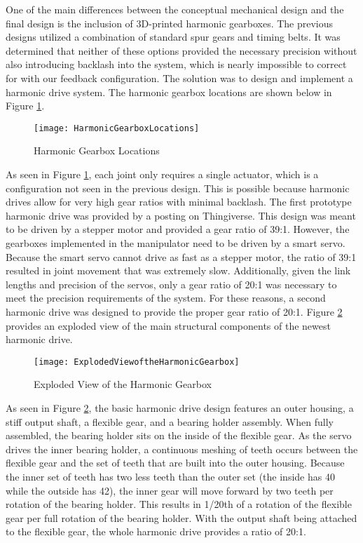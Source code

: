 One of the main differences between the conceptual mechanical design and the final design is the inclusion of 3D-printed harmonic gearboxes. The previous designs utilized a combination of standard spur gears and timing belts. It was determined that neither of these options provided the necessary precision without also introducing backlash into the system, which is nearly impossible to correct for with our feedback configuration. The solution was to design and implement a harmonic drive system. The harmonic gearbox locations are shown below in Figure \ref{fig:HarmonicGearboxLocations}.

\begin{figure}[htp]
  \centering
  \texttt{[image: HarmonicGearboxLocations]}
  \caption{Harmonic Gearbox Locations}
  \label{fig:HarmonicGearboxLocations}
\end{figure}

As seen in Figure \ref{fig:HarmonicGearboxLocations}, each joint only requires a single actuator, which is a configuration not seen in the previous design. This is possible because harmonic drives allow for very high gear ratios with minimal backlash. The first prototype harmonic drive was provided by a posting on Thingiverse. This design was meant to be driven by a stepper motor and provided a gear ratio of 39:1. However, the gearboxes implemented in the manipulator need to be driven by a smart servo. Because the smart servo cannot drive as fast as a stepper motor, the ratio of 39:1 resulted in joint movement that was extremely slow. Additionally, given the link lengths and precision of the servos, only a gear ratio of 20:1 was necessary to meet the precision requirements of the system. For these reasons, a second harmonic drive was designed to provide the proper gear ratio of 20:1. Figure \ref{fig:ExplodedViewoftheHarmonicGearbox} provides an exploded view of the main structural components of the newest harmonic drive.

\begin{figure}[htp]
  \centering
  \texttt{[image: ExplodedViewoftheHarmonicGearbox]}
  \caption{Exploded View of the Harmonic Gearbox}
  \label{fig:ExplodedViewoftheHarmonicGearbox}
\end{figure}

As seen in Figure \ref{fig:ExplodedViewoftheHarmonicGearbox}, the basic harmonic drive design features an outer housing, a stiff output shaft, a flexible gear, and a bearing holder assembly. When fully assembled, the bearing holder sits on the inside of the flexible gear. As the servo drives the inner bearing holder, a continuous meshing of teeth occurs between the flexible gear and the set of teeth that are built into the outer housing. Because the inner set of teeth has two less teeth than the outer set (the inside has 40 while the outside has 42), the inner gear will move forward by two teeth per rotation of the bearing holder. This results in 1/20th of a rotation of the flexible gear per full rotation of the bearing holder. With the output shaft being attached to the flexible gear, the whole harmonic drive provides a ratio of 20:1.
